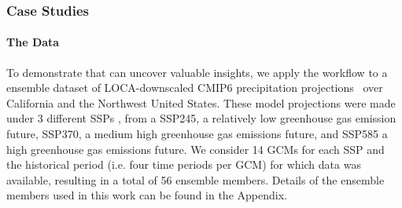 

\subsubsection{Case Studies}
\paragraph{The Data}
To demonstrate that \ClimateSOM can uncover valuable insights, we apply the workflow to a ensemble dataset of LOCA-downscaled CMIP6 precipitation projections~\cite{pierce2014statistical,pierce2015improved,eyring2016overview} over California and the Northwest United States\cite{pierce2023future}.
%
%
%
These model projections were made under 3 different SSPs \cite{riahi2017shared}, from a  SSP245, a relatively low greenhouse gas emission future, SSP370, a medium high greenhouse gas emissions future, and SSP585 a high greenhouse gas emissions future. 
%
We consider 14 GCMs for each SSP and the historical period (i.e. four time periods per GCM) for which data was available, resulting in a total of 56 ensemble members.
%
Details of the ensemble members used in this work can be found in the Appendix.

